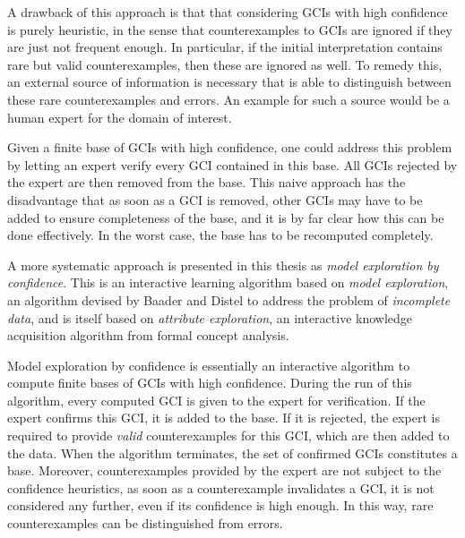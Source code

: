 \documentclass[english,fleqn]{scrartcl}
\begin{document}
A drawback of this approach is that that considering GCIs with high confidence is purely
heuristic, in the sense that counterexamples to GCIs are ignored if they are just not
frequent enough.  In particular, if the initial interpretation contains rare but valid
counterexamples, then these are ignored as well.  To remedy this, an external source of
information is necessary that is able to distinguish between these rare counterexamples
and errors.  An example for such a source would be a human expert for the domain of
interest.

Given a finite base of GCIs with high confidence, one could address this problem by
letting an expert verify every GCI contained in this base.  All GCIs rejected by the
expert are then removed from the base.  This naive approach has the disadvantage that as
soon as a GCI is removed, other GCIs may have to be added to ensure completeness of the
base, and it is by far clear how this can be done effectively.  In the worst case, the
base has to be recomputed completely.

A more systematic approach is presented in this thesis as \emph{model exploration by
  confidence}.  This is an interactive learning algorithm based on \emph{model
  exploration}, an algorithm devised by Baader and Distel to address the problem of
\emph{incomplete data}, and is itself based on \emph{attribute exploration}, an
interactive knowledge acquisition algorithm from formal concept analysis.

Model exploration by confidence is essentially an interactive algorithm to compute finite
bases of GCIs with high confidence.  During the run of this algorithm, every computed GCI
is given to the expert for verification.  If the expert confirms this GCI, it is added to
the base.  If it is rejected, the expert is required to provide \emph{valid}
counterexamples for this GCI, which are then added to the data.  When the algorithm
terminates, the set of confirmed GCIs constitutes a base.  Moreover, counterexamples
provided by the expert are not subject to the confidence heuristics, \ie as soon as a
counterexample invalidates a GCI, it is not considered any further, even if its confidence
is high enough.  In this way, rare counterexamples can be distinguished from errors.

\printbibliography{}
\end{document}
